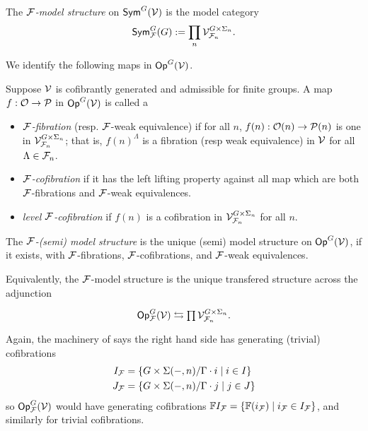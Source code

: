 \documentclass[a4paper,10pt]{article}%
\begin{document}
\begin{definition}
  The \textit{$\mathcal F$-model structure} on $\mathsf{Sym}^G(\mathcal V)$ is the model category
\[
\mathsf{Sym}^G_{\mathcal F}(G) := \prod\limits_n \mathcal V^{G\times \Sigma_n}_{\mathcal F_n}.
\]
\end{definition}

We identify the following maps in $\mathsf{Op}^G(\mathcal V)$.
\begin{definition}
  \label{F_MAPS_DEFINITION}
  Suppose $\mathcal V$ is cofibrantly generated and admissible for finite groups. A map $f: \mathcal{O} \to \mathcal{P}$ in $\mathsf{Op}^G(\mathcal V)$ is called a
  \begin{itemize}
  \item \textit{$\mathcal F$-fibration} (resp. $\mathcal F$-weak equivalence) if for all $n$, $f(n): \mathcal{O}(n) \to \mathcal{P}(n)$ is one in $\mathcal V^{G \times \Sigma_n}_{\mathcal F_n}$; that is, $f(n)^\Lambda$ is a fibration (resp weak equivalence) in $\mathcal V$ for all $\Lambda \in \mathcal F_n$.
  \item \textit{$\mathcal F$-cofibration} if it has the left lifting property against all map which are both $\mathcal F$-fibrations and $\mathcal F$-weak equivalences. 
  \item \textit{level $\mathcal F$-cofibration} if $f(n)$ is a cofibration in $\mathcal V^{G\times \Sigma_n}_{\mathcal F_n}$ for all $n$.
  \end{itemize}
\end{definition}

\begin{definition}
  The \textit{$\mathcal F$-(semi) model structure} is the unique (semi) model structure on $\mathsf{Op}^G(\mathcal V)$, if it exists, with $\mathcal F$-fibrations, $\mathcal F$-cofibrations, and $\mathcal F$-weak equivalences. 
\end{definition}
Equivalently, the $\mathcal F$-model structure is the unique transfered structure across the adjunction
\[
\begin{tikzcd}
  \Op^G_\F(\V) \leftrightarrows \prod \V^{G \times \Sigma_n}_{\F_n}.
\end{tikzcd}
\]
Again, the machinery of \cite{SS00} says the right hand side has generating (trivial) cofibrations
\begin{align*}
  I_{\mathcal F} &= \left\{ G \times \Sigma(-,n)/\Gamma \cdot i \;|\; i \in I\right\}\\
  J_{\mathcal F} &= \left\{ G \times \Sigma(-,n)/\Gamma \cdot j \;|\; j \in J\right\}
\end{align*}
so $\mathsf{Op}^G_{\mathcal F}(\mathcal V)$ would have generating cofibrations $\mathbb F I_{\mathcal F} = \left\{ \mathbb F (i_{\mathcal F}) \;|\; i_{\mathcal F}\in I_{\mathcal F}\right\}$, and similarly for trivial cofibrations.
\end{document}
